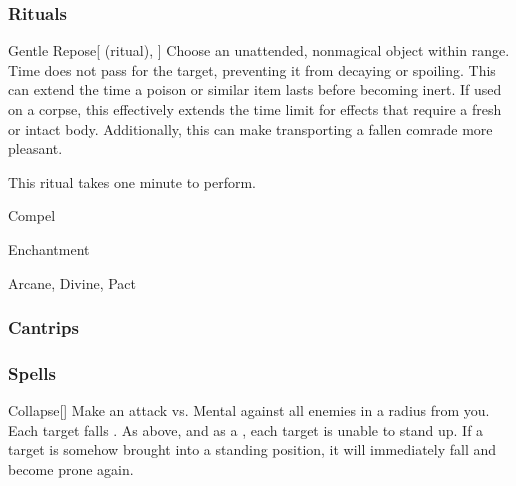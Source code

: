 \subsubsection{Rituals}


\lowercase{\hypertarget{spell:Gentle Repose}{}}\label{spell:Gentle Repose}
\begin{attuneability}[\nth{2}]{\hypertarget{spell:Gentle Repose}{Gentle Repose}}[ (ritual), ]
Choose an unattended, nonmagical object within \rngclose range.
Time does not pass for the target, preventing it from decaying or spoiling.
This can extend the time a poison or similar item lasts before becoming inert.
If used on a corpse, this effectively extends the time limit for effects that require a fresh or intact body.
Additionally, this can make transporting a fallen comrade more pleasant.


This ritual takes one minute to perform.
\end{attuneability}
\vspace{0.25em}


\newpage
\begin{spellsection}{Compel}

\begin{spellheader}
\end{spellheader}


 Enchantment

 Arcane, Divine, Pact

\subsubsection{Cantrips}


\end{spellsection}


\subsubsection{Spells}


\lowercase{\hypertarget{spell:Collapse}{}}\label{spell:Collapse}
\begin{freeability}[\nth{1}]{\hypertarget{spell:Collapse}{Collapse}}[]
Make an attack vs. Mental against all enemies in a \areamed radius from you.
\hit Each target falls .
\crit As above, and as a , each target is unable to stand up.
If a target is somehow brought into a standing position, it will immediately fall and become prone again.
\end{freeability}
\vspace{0.25em}



